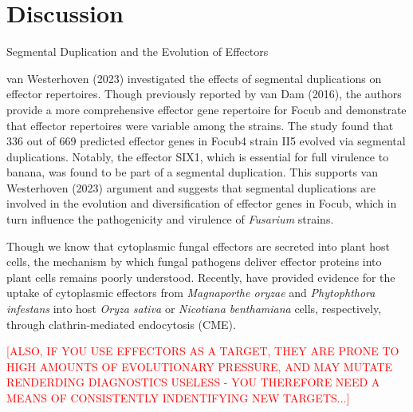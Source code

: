 









\newpage
\section{Discussion}

\ac{Segmental Duplication and the Evolution of Effectors}

van Westerhoven \et (2023) investigated the effects of segmental duplications on effector repertoires.  Though previously reported by van Dam \et (2016), the authors provide a more comprehensive effector gene repertoire for \ac{Focub} and demonstrate that effector repertoires were variable among the strains. The study found that 336 out of 669 predicted effector genes in \ac{Focub4} strain II5 evolved via segmental duplications. Notably, the effector SIX1, which is essential for full virulence to banana, was found to be part of a segmental duplication. This supports van Westerhoven \et (2023) argument and suggests that segmental duplications are involved in the evolution and diversification of effector genes in \ac{Focub}, which in turn influence the pathogenicity and virulence of \textit{Fusarium} strains.

Though we know that cytoplasmic fungal effectors are secreted into plant host cells, the mechanism by which fungal pathogens deliver effector proteins into plant cells remains poorly understood. Recently, \textcite{Oliveira-Garcia2023, Wang2023} have provided evidence for the uptake of cytoplasmic effectors from \textit{Magnaporthe oryzae} and \textit{Phytophthora infestans} into host \textit{Oryza sativa} or \textit{Nicotiana benthamiana} cells, respectively, through clathrin-mediated endocytosis (CME).  

\textcolor{red}{[ALSO, IF YOU USE EFFECTORS AS A TARGET, THEY ARE PRONE TO HIGH AMOUNTS OF EVOLUTIONARY PRESSURE, AND MAY MUTATE RENDERDING DIAGNOSTICS USELESS - YOU THEREFORE NEED A MEANS OF CONSISTENTLY INDENTIFYING NEW TARGETS...]}